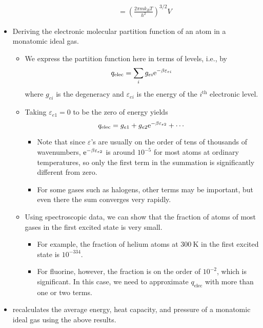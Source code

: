 \documentclass[../notes.tex]{subfiles}
\begin{document}
\begin{itemize}
\begin{itemize}
\begin{align*}
            &= \left( \frac{2\pi mk_BT}{h^2} \right)^{3/2}V
        \end{align*}
    \end{itemize}
    \item {}Deriving the electronic molecular partition function of an atom in a monatomic ideal gas.
    \begin{itemize}
        \item We express the partition function here in terms of levels, i.e., by
        \begin{equation*}
            q_\text{elec} = \sum_ig_{ei}\e[-\beta\varepsilon_{ei}]
        \end{equation*}
        where $g_{ei}$ is the degeneracy and $\varepsilon_{ei}$ is the energy of the $i^\text{th}$ electronic level.
        \item Taking $\varepsilon_{e1}=0$ to be the zero of energy yields
        \begin{equation*}
            q_\text{elec} = g_{e1}+g_{e2}\e[-\beta\varepsilon_{e2}]+\cdots
        \end{equation*}
        \begin{itemize}
            \item Note that since $\varepsilon$'s are usually on the order of tens of thousands of wavenumbers, $\e[-\beta\varepsilon_{e2}]$ is around $10^{-5}$ for most atoms at ordinary temperatures, so only the first term in the summation is significantly different from zero.
            \item For some gases such as halogens, other terms may be important, but even there the sum converges very rapidly.
        \end{itemize}
        \item Using spectroscopic data, we can show that the fraction of atoms of most gases in the first excited state is very small.
        \begin{itemize}
            \item For example, the fraction of helium atoms at $\SI{300}{\kelvin}$ in the first excited state is $10^{-334}$.
            \item For fluorine, however, the fraction is on the order of $10^{-2}$, which is significant. In this case, we need to approximate $q_\text{elec}$ with more than one or two terms.
        \end{itemize}
    \end{itemize}
    \item \textcite{bib:McQuarrieSimon} recalculates the average energy, heat capacity, and pressure of a monatomic ideal gas using the above results.

\end{itemize}
\end{document}
